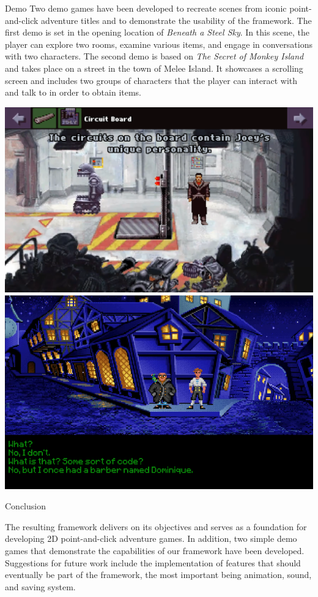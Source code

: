 \documentclass[portrait,a0paper,fontscale=0.35]{baposter}
\begin{document}
\begin{poster}
\begin{posterbox}[column=1, name=result2, below=ds]{Demo}
Two demo games have been developed to recreate scenes from iconic point-and-click adventure titles and to demonstrate the usability of the framework. The first demo is set in the opening location of \textit{Beneath a Steel Sky}. In this scene, the player can explore two rooms, examine various items, and engage in conversations with two characters. The second demo is based on \textit{The Secret of Monkey Island} and takes place on a street in the town of Melee Island. It showcases a scrolling screen and includes two groups of characters that the player can interact with and talk to in order to obtain items. 
\begin{center}
\includegraphics[width=0.506\linewidth]{img/manual.png}
\includegraphics[width=0.486\linewidth]{img/manual-tsomi.png}
\end{center}
\end{posterbox}


\begin{posterbox}[column=1, name=conclusion, below=result2, headerColorOne=yellow!80!orange!95!black, boxColorOne=yellow!33]{Conclusion}


The resulting framework delivers on its objectives and serves as a foundation for developing 2D point-and-click adventure games. In addition, two simple demo games that demonstrate the capabilities of our framework have been developed. Suggestions for future work include the implementation of features that should eventually be part of the framework, the most important being animation, sound, and saving system. 


\end{posterbox}
\end{poster}
\end{document}
